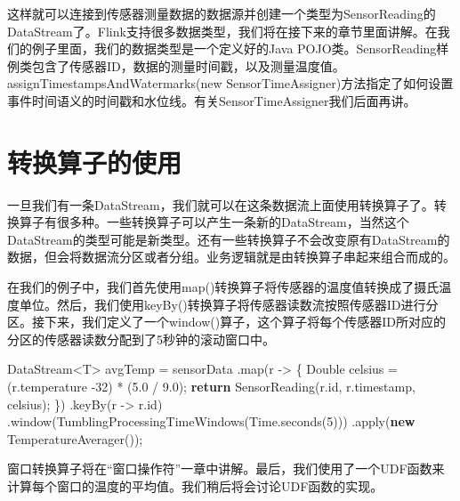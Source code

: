 \documentclass[cn,11pt,chinese]{elegantbook}
\newenvironment{Shaded}{}{}
\newcommand{\BuiltInTok}[1]{#1}
\newcommand{\DecValTok}[1]{\textcolor[rgb]{0.25,0.63,0.44}{#1}}
\newcommand{\FloatTok}[1]{\textcolor[rgb]{0.25,0.63,0.44}{#1}}
\newcommand{\FunctionTok}[1]{\textcolor[rgb]{0.02,0.16,0.49}{#1}}
\newcommand{\KeywordTok}[1]{\textcolor[rgb]{0.00,0.44,0.13}{\textbf{#1}}}
\newcommand{\NormalTok}[1]{#1}
\begin{document}
这样就可以连接到传感器测量数据的数据源并创建一个类型为SensorReading的DataStream了。Flink支持很多数据类型，我们将在接下来的章节里面讲解。在我们的例子里面，我们的数据类型是一个定义好的Java
POJO类。SensorReading样例类包含了传感器ID，数据的测量时间戳，以及测量温度值。assignTimestampsAndWatermarks(new
SensorTimeAssigner)方法指定了如何设置事件时间语义的时间戳和水位线。有关SensorTimeAssigner我们后面再讲。

\hypertarget{ux8f6cux6362ux7b97ux5b50ux7684ux4f7fux7528}{%
\section{转换算子的使用}\label{ux8f6cux6362ux7b97ux5b50ux7684ux4f7fux7528}}

一旦我们有一条DataStream，我们就可以在这条数据流上面使用转换算子了。转换算子有很多种。一些转换算子可以产生一条新的DataStream，当然这个DataStream的类型可能是新类型。还有一些转换算子不会改变原有DataStream的数据，但会将数据流分区或者分组。业务逻辑就是由转换算子串起来组合而成的。

在我们的例子中，我们首先使用map()转换算子将传感器的温度值转换成了摄氏温度单位。然后，我们使用keyBy()转换算子将传感器读数流按照传感器ID进行分区。接下来，我们定义了一个window()算子，这个算子将每个传感器ID所对应的分区的传感器读数分配到了5秒钟的滚动窗口中。

\begin{Shaded}
\begin{Highlighting}[]
\NormalTok{DataStream\textless{}T\textgreater{} avgTemp = sensorData}
\NormalTok{  .}\FunctionTok{map}\NormalTok{(r {-}\textgreater{} \{}
    \BuiltInTok{Double}\NormalTok{ celsius = (r.}\FunctionTok{temperature}\NormalTok{ {-}}\DecValTok{32}\NormalTok{) * (}\FloatTok{5.}\DecValTok{0}\NormalTok{ / }\FloatTok{9.}\DecValTok{0}\NormalTok{);}
    \KeywordTok{return} \FunctionTok{SensorReading}\NormalTok{(r.}\FunctionTok{id}\NormalTok{, r.}\FunctionTok{timestamp}\NormalTok{, celsius);}
\NormalTok{  \})}
\NormalTok{  .}\FunctionTok{keyBy}\NormalTok{(r {-}\textgreater{} r.}\FunctionTok{id}\NormalTok{)}
\NormalTok{  .}\FunctionTok{window}\NormalTok{(}\FunctionTok{TumblingProcessingTimeWindows}\NormalTok{(}\BuiltInTok{Time}\NormalTok{.}\FunctionTok{seconds}\NormalTok{(}\DecValTok{5}\NormalTok{)))}
\NormalTok{  .}\FunctionTok{apply}\NormalTok{(}\KeywordTok{new} \FunctionTok{TemperatureAverager}\NormalTok{());}
\end{Highlighting}
\end{Shaded}

窗口转换算子将在``窗口操作符''一章中讲解。最后，我们使用了一个UDF函数来计算每个窗口的温度的平均值。我们稍后将会讨论UDF函数的实现。
\end{document}
